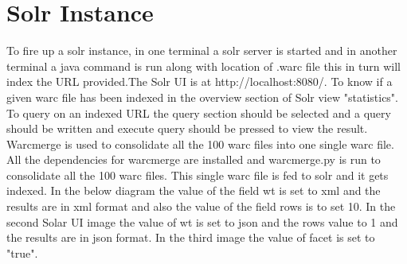 \documentclass[paper=a4, fontsize=11pt]{scrartcl} %
\numberwithin{equation}{section} %
\numberwithin{figure}{section} %
\numberwithin{table}{section} %
\begin{document}


\section{Solr Instance}

To fire up a solr instance, in one terminal a solr server is started and in another terminal a java command is run along with location of .warc file this in turn will index the URL provided.The Solr UI is at http://localhost:8080/. To know if a given warc file has been indexed in the overview section of Solr view "statistics".
To query on an indexed URL the query section should be selected and a query should be written and execute query should be pressed to view the result.
Warcmerge is used to consolidate all the 100 warc files into one single warc file. All the dependencies for warcmerge are installed and warcmerge.py is run to consolidate all the 100 warc files. This single warc file is fed to solr and it gets indexed.
In the below diagram the value of the field wt is set to xml and the results are in xml format and also the value of the field rows is to set 10.
In the second Solar UI image the value of wt is set to json and the rows value to 1 and the results are in json format.
In the third image the value of facet is set to "true".
\end{document}
